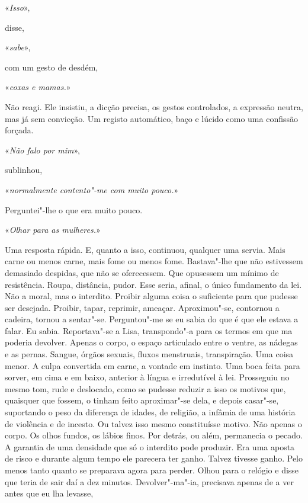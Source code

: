 «\emph{Isso}»,

disse,

«\emph{sabe}»,

com um gesto de desdém,

«\emph{coxas e mamas.}»

Não reagi. Ele insistiu, a dicção precisa, os gestos controlados, a
expressão neutra, mas já sem convicção. Um registo automático, baço e
lúcido como uma confissão forçada.

«\emph{Não falo por mim}»,

sublinhou,

«\emph{normalmente contento"-me com muito pouco.}»

Perguntei"-lhe o que era muito pouco.

«\emph{Olhar para as mulheres.}»

Uma resposta rápida. E, quanto a isso, continuou, qualquer uma servia.
Mais carne ou menos carne, mais fome ou menos fome. Bastava"-lhe que não
estivessem demasiado despidas, que não se oferecessem. Que opusessem um
mínimo de resistência. Roupa, distância, pudor. Esse seria, afinal, o
único fundamento da lei. Não a moral, mas o interdito. Proibir alguma
coisa o suficiente para que pudesse ser desejada. Proibir, tapar,
reprimir, ameaçar. Aproximou"-se, contornou a cadeira, tornou a
sentar"-se. Perguntou"-me se eu sabia do que é que ele estava a falar.
Eu sabia. Reportava"-se a Lisa, transpondo"-a para os termos em que ma
poderia devolver. Apenas o corpo, o espaço articulado entre o ventre, as
nádegas e as pernas. Sangue, órgãos sexuais, fluxos menstruais,
transpiração. Uma coisa menor. A culpa convertida em carne, a vontade em
instinto. Uma boca feita para sorver, em cima e em baixo, anterior à
língua e irredutível à lei. Prosseguiu no mesmo tom, rude e deslocado,
como se pudesse reduzir a isso os motivos que, quaisquer que fossem, o
tinham feito aproximar"-se dela, e depois casar"-se, suportando o peso
da diferença de idades, de religião, a infâmia de uma história de
violência e de incesto. Ou talvez isso mesmo constituísse motivo. Não
apenas o corpo. Os olhos fundos, os lábios finos. Por detrás, ou além,
permanecia o pecado. A garantia de uma densidade que só o interdito pode
produzir. Era uma aposta de risco e durante algum tempo ele parecera ter
ganho. Talvez tivesse ganho. Pelo menos tanto quanto se preparava agora
para perder. Olhou para o relógio e disse que teria de sair daí a dez
minutos. Devolver"-ma"-ia, precisava apenas de a ver antes que eu lha
levasse,

